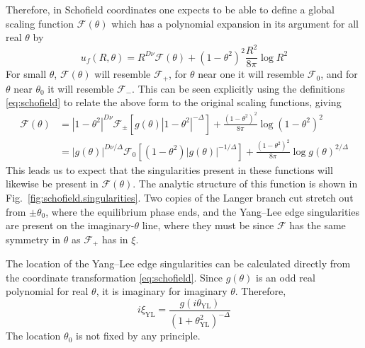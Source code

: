 \documentclass[
aps,
pre,
preprint,
longbibliography,
floatfix
]{revtex4-2}
\begin{document}
Therefore, in Schofield coordinates one expects to be able to define a global
scaling function $\mathcal F(\theta)$ which has a polynomial expansion in its
argument for all real $\theta$ by
\begin{equation}
  u_f(R,\theta)=R^{D\nu}\mathcal F(\theta)+(1-\theta^2)^2\frac{R^2}{8\pi}\log R^2
\end{equation}
For small $\theta$, $\mathcal F(\theta)$ will
resemble $\mathcal F_+$, for $\theta$ near one it will resemble $\mathcal F_0$,
and for $\theta$ near $\theta_0$ it will resemble $\mathcal F_-$. This can be
seen explicitly using the definitions \eqref{eq:schofield} to relate the above
form to the original scaling functions, giving
\begin{equation} \label{eq:scaling.function.equivalences.2d}
  \begin{aligned}
    \mathcal F(\theta)
    &=|1-\theta^2|^{D\nu}\mathcal F_\pm\left[g(\theta)|1-\theta^2|^{-\Delta}\right]
    +\frac{(1-\theta^2)^2}{8\pi}\log(1-\theta^2)^2\\
    &=|g(\theta)|^{D\nu/\Delta}\mathcal F_0\left[(1-\theta^2)|g(\theta)|^{-1/\Delta}\right]
    +\frac{(1-\theta^2)^2}{8\pi}\log g(\theta)^{2/\Delta}
  \end{aligned}
\end{equation}
This leads us
to expect that the singularities present in these functions will likewise be
present in $\mathcal F(\theta)$. The analytic structure of this function is
shown in Fig.~\ref{fig:schofield.singularities}. Two copies of the Langer
branch cut stretch out from $\pm\theta_0$, where the equilibrium phase ends,
and the Yang--Lee edge singularities are present on the imaginary-$\theta$
line, where they must be since $\mathcal F$ has the same symmetry in $\theta$
as $\mathcal F_+$ has in $\xi$.

The location of the Yang--Lee edge singularities can be calculated directly
from the coordinate transformation \eqref{eq:schofield}. Since $g(\theta)$ is
an odd real polynomial for real $\theta$, it is imaginary for imaginary
$\theta$. Therefore,
\begin{equation} \label{eq:yang-lee.theta}
  i\xi_{\mathrm{YL}}=\frac{g(i\theta_{\mathrm{YL}})}{(1+\theta_{\mathrm{YL}}^2)^{-\Delta}}
\end{equation}
The location $\theta_0$ is not fixed by any principle.
\end{document}
